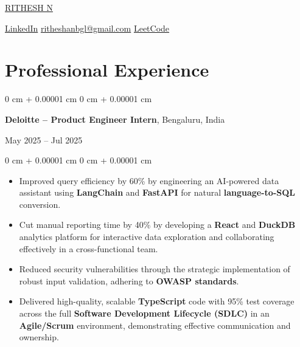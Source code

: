 \documentclass[10pt, letterpaper]{article}
\newenvironment{highlights}{
    \begin{itemize}[
        topsep=0.10 cm,
        parsep=0.10 cm,
        partopsep=0pt,
        itemsep=0pt,
        leftmargin=0 cm + 10pt
    ]
}{
    \end{itemize}
} %
\newenvironment{onecolentry}{
    \begin{adjustwidth}{
        0 cm + 0.00001 cm
    }{
        0 cm + 0.00001 cm
    }
}{
    \end{adjustwidth}
} %
\newenvironment{twocolentry}[2][]{
    \onecolentry
    \def\secondColumn{#2}
    \setcolumnwidth{\fill, 4.5 cm}
    \begin{paracol}{2}
}{
    \switchcolumn \raggedleft \secondColumn
    \end{paracol}
    \endonecolentry
} %
\newenvironment{header}{
    \setlength{\topsep}{0pt}\par\kern\topsep\centering\linespread{1.5}
}{
    \par\kern\topsep
} %
\begin{document}
\begin{header}

    \fontsize{30}{36}\selectfont
\href{https://rithesh.engineer/}{{RITHESH N}}

    \vspace{5 pt}

    \normalsize
    \mbox{\raisebox{-0.1\height}{\Large \faLinkedin}\hspace{3pt}\href{https://www.linkedin.com/in/ritheshan/}{\textcolor{blueHighlight}{\large LinkedIn}}} \hspace{12pt}%
\mbox{\raisebox{-0.15\height}{\Large \faEnvelope}\hspace{3pt}\href{mailto:ritheshanbgl@gmail.com}{\textcolor{blueHighlight}{\large ritheshanbgl@gmail.com}}} \hspace{8pt}%
\mbox{\hspace{3pt}\href{https://leetcode.com/rithesh_n}{\textcolor{blueHighlight}{\large LeetCode}}}%
\end{header}

    \vspace{10 pt  }

    \section{Professional Experience}

       \begin{twocolentry}{
    May 2025 – Jul 2025
}
    \textbf{\textcolor{blueHighlight}{\large Deloitte} – Product Engineer Intern}, Bengaluru, India
\end{twocolentry}

\vspace{0.10 cm}
\begin{onecolentry}
    \begin{highlights}
        \item Improved query efficiency by 60\% by engineering an AI-powered data assistant using \textbf{LangChain} and \textbf{FastAPI} for natural \textbf{language-to-SQL} conversion.
        \item Cut manual reporting time by 40\% by developing a \textbf{React} and \textbf{DuckDB} analytics platform for interactive data exploration and collaborating effectively in a cross-functional team.
        \item Reduced security vulnerabilities through the strategic implementation of robust input validation, adhering to \textbf{OWASP standards}.
        \item Delivered high-quality, scalable \textbf{TypeScript} code with 95\% test coverage across the full \textbf{Software Development Lifecycle (SDLC)} in an \textbf{Agile/Scrum} environment, demonstrating effective communication and ownership.
    \end{highlights}
\end{onecolentry}
\end{document}
